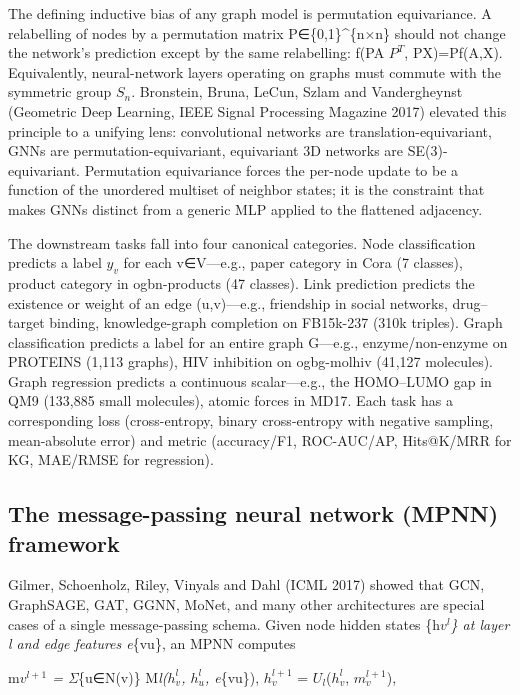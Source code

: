 \documentclass{article}
\begin{document}
The defining inductive bias of any graph model is permutation equivariance. A relabelling of nodes by a permutation matrix P∈\{0,1\}\^{}\{n×n\} should not change the network's prediction except by the same relabelling: f(PA \(P^T\), PX)=Pf(A,X). Equivalently, neural-network layers operating on graphs must commute with the symmetric group \(S_n\). Bronstein, Bruna, LeCun, Szlam and Vandergheynst (Geometric Deep Learning, IEEE Signal Processing Magazine 2017) elevated this principle to a unifying lens: convolutional networks are translation-equivariant, GNNs are permutation-equivariant, equivariant 3D networks are SE(3)-equivariant. Permutation equivariance forces the per-node update to be a function of the unordered multiset of neighbor states; it is the constraint that makes GNNs distinct from a generic MLP applied to the flattened adjacency.

The downstream tasks fall into four canonical categories. Node classification predicts a label \(y_v\) for each v∈V---e.g., paper category in Cora (7 classes), product category in ogbn-products (47 classes). Link prediction predicts the existence or weight of an edge (u,v)---e.g., friendship in social networks, drug--target binding, knowledge-graph completion on FB15k-237 (310k triples). Graph classification predicts a label for an entire graph G---e.g., enzyme/non-enzyme on PROTEINS (1,113 graphs), HIV inhibition on ogbg-molhiv (41,127 molecules). Graph regression predicts a continuous scalar---e.g., the HOMO--LUMO gap in QM9 (133,885 small molecules), atomic forces in MD17. Each task has a corresponding loss (cross-entropy, binary cross-entropy with negative sampling, mean-absolute error) and metric (accuracy/F1, ROC-AUC/AP, Hits@K/MRR for KG, MAE/RMSE for regression).

\subsection{The message-passing neural network (MPNN) framework}\label{the-message-passing-neural-network-mpnn-framework}

Gilmer, Schoenholz, Riley, Vinyals and Dahl (ICML 2017) showed that GCN, GraphSAGE, GAT, GGNN, MoNet, and many other architectures are special cases of a single message-passing schema. Given node hidden states \{h\emph{\(v^l\)\} at layer l and edge features e}\{vu\}, an MPNN computes

m\emph{\(v^{l+1}\) = Σ}\{u∈N(v)\} M\emph{l(\(h_v^l\), \(h_u^l\), e}\{vu\}),
\(h_v^{l+1}\) = \(U_l\)(\(h_v^l\), \(m_v^{l+1}\)),
\end{document}

